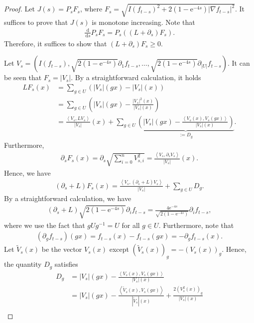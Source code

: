 \documentclass[11pt]{article}
\theoremstyle{plain}
\theoremstyle{definition}
\theoremstyle{remark}
\newcommand{\dif}{\,\mathrm{d}}
\newcommand{\e}{\mathrm{e}}
\newcommand{\tuple}[1]{\left(#1\right)}
\newcommand{\inner}[2]{\left\langle #1,#2\right\rangle}
\newcommand{\tp}{\tuple}
\newcommand{\abs}[1]{\left\vert#1\right\vert}
\begin{document}
\begin{proof}
    Let $J(s) = P_s F_s$, where $F_s = \sqrt{I(f_{t-s})^2 + 2\tp{1-\e^{-4s}} \abs{\nabla f_{t-s}}^2}$.
    It suffices to prove that $J(s)$ is monotone increasing. 
    Note that
    \begin{align*}
        \frac{\dif}{\dif s} P_s F_s = P_s \tp{(L + \partial_s) F_s}.
    \end{align*}
    Therefore, it suffices to show that $(L+\partial_s) F_s \ge 0$.

    Let $V_s = (I(f_{t-s}), \sqrt{2\tp{1-\e^{-4s}}} \partial_1 f_{t-s}, \ldots, \sqrt{2\tp{1-\e^{-4s}}} \partial_{\abs{U}} f_{t-s})$. 
    It can be seen that $F_s = \abs{V_s}$. By a straightforward calculation, it holds
    \begin{align*}
        L F_s(x) &=  \sum_{g \in U} \tp{|V_s|(g x) - |V_s|(x)}\\
        &= \sum_{g \in U} \tp{\abs{V_s}(g x) - \frac{\abs{V_s}^2(x)}{\abs{V_s}(x)}}\\
        &= \frac{\inner{V_s}{LV_s}}{\abs{V_s}}(x) + \sum_{g \in U} \underbrace{\tp{\abs{V_s}(g x) - \frac{\inner{V_s(x)}{V_s(g x)} }{\abs{V_s}(x)}}}_{:=D_g}.
    \end{align*}
    Furthermore,
\begin{align*}
\partial_s F_s(x) = \partial_s \sqrt{\sum_{i=0}^n V_{s,i}^2} = \frac{\inner{V_{s}}{\partial_s V_s}}{\abs{V_s}}(x). 
\end{align*}
Hence, we have
\begin{align*}
    (\partial_s + L) F_s(x) = \frac{\inner{V_s}{(\partial_s + L)V_s}}{\abs{V_s}} + \sum_{g \in U} D_g.
\end{align*}
By a straightforward calculation, we have
\begin{align*}
    (\partial_s+L) \sqrt{2(1-\e^{-4s})} \partial_i f_{t-s} = \frac{4\e^{-4s}}{\sqrt{2(1-\e^{-4s})}} \partial_i f_{t-s},
\end{align*}
where we use the fact that $g U g^{-1} = U$ for all $g \in U$.
Furthermore, note that
\begin{align*}
    (\partial_{g} f_{t-s})(gx) = f_{t-s}(x) - f_{t-s}(g x) = - \partial_g f_{t-s}(x).
\end{align*}
Let $\widetilde{V}_s(x)$ be the vector $V_s(x)$ except $(\widetilde{V}_s(x))_g = - (V_s(x))_g$.
Hence, the quantity $D_g$ satisfies
\begin{align*}
    D_g &= \abs{V_s}(gx) - \frac{\inner{V_s(x)}{V_s(gx)}}{\abs{V_s}(x)}\\
    &=\abs{V_s}(gx) - \frac{\inner{\widetilde{V}_s(x)}{V_s(gx)}}{\abs{\widetilde{V}_s}(x)} + \frac{2(V^2_s(x))_g}{\abs{V_s}(x)}\\

\end{align*}
\end{proof}
\end{document}
